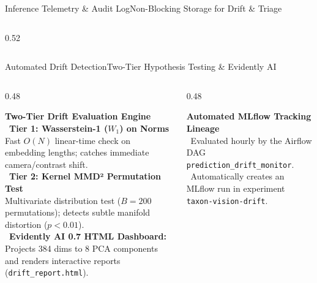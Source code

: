 \documentclass[aspectratio=169,10pt]{beamer}
\begin{document}
\begin{frame}{Inference Telemetry \& Audit Log}{Non-Blocking Storage for Drift \& Triage}
\begin{columns}[T]
\begin{column}{0.52\textwidth}
        \end{column}
    \end{columns}
\end{frame}

\begin{frame}{Automated Drift Detection}{Two-Tier Hypothesis Testing \& Evidently AI}
    \begin{columns}[T]
        \begin{column}{0.48\textwidth}
            \begin{bluecard}
                \textbf{\color{BlueAccent} Two-Tier Drift Evaluation Engine}\\[3pt]
                \textbullet\ \textbf{Tier 1: Wasserstein-1 ($W_1$) on Norms}\\
                \quad Fast $O(N)$ linear-time check on embedding lengths; catches immediate camera/contrast shift.\\[3pt]
                \textbullet\ \textbf{Tier 2: Kernel MMD² Permutation Test}\\
                \quad Multivariate distribution test ($B=200$ permutations); detects subtle manifold distortion ($p < 0.01$).\\[3pt]
                \textbullet\ \textbf{Evidently AI 0.7 HTML Dashboard:}\\
                \quad Projects 384 dims to 8 PCA components and renders interactive reports (\texttt{drift\_report.html}).
            \end{bluecard}
        \end{column}
        \begin{column}{0.48\textwidth}
            \begin{greencard}
                \textbf{\color{GreenAccent} Automated MLflow Tracking Lineage}\\[3pt]
                \textbullet\ Evaluated hourly by the Airflow DAG \texttt{prediction\_drift\_monitor}.\\[3pt]
                \textbullet\ Automatically creates an MLflow run in experiment \texttt{taxon-vision-drift}.\\[3pt]

\end{greencard}
\end{column}
\end{columns}
\end{frame}
\end{document}
